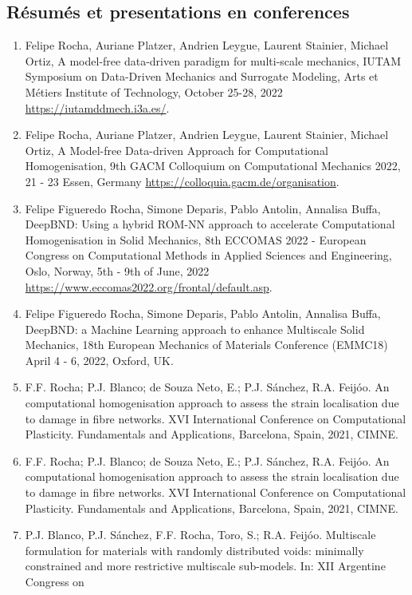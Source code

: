 \documentclass[french]{article}
\begin{document}
\subsection*{Résumés et presentations en conferences} 
\begin{enumerate}
	\item Felipe Rocha, Auriane Platzer, Andrien Leygue, Laurent Stainier, Michael Ortiz, A model-free data-driven paradigm for multi-scale mechanics, IUTAM Symposium on Data-Driven Mechanics and Surrogate Modeling, Arts et Métiers Institute of Technology, October 25-28, 2022 \url{https://iutamddmech.i3a.es/}.
	\item Felipe Rocha, Auriane Platzer, Andrien Leygue, Laurent Stainier, Michael Ortiz, A Model-free Data-driven Approach for Computational Homogenisation, 9th GACM Colloquium on Computational Mechanics 2022, 21 - 23 Essen, Germany \url{https://colloquia.gacm.de/organisation}.
	\item Felipe Figueredo Rocha, Simone Deparis, Pablo Antolin, Annalisa Buffa, 
	DeepBND: Using a hybrid ROM-NN approach to accelerate Computational Homogenisation in Solid Mechanics, 8th ECCOMAS 2022 - European Congress on Computational Methods
	in Applied Sciences and Engineering, Oslo, Norway, 5th - 9th of June, 2022 \url{https://www.eccomas2022.org/frontal/default.asp}.
	\item Felipe Figueredo Rocha, Simone Deparis, Pablo Antolin, Annalisa Buffa, 
	DeepBND: a Machine Learning approach to enhance Multiscale Solid Mechanics, 18th European Mechanics of Materials Conference (EMMC18)
	April 4 - 6, 2022, Oxford, UK.
	\item F.F. Rocha; P.J. Blanco; de Souza Neto, E.; P.J. Sánchez, R.A. Feijóo. An computational homogenisation approach to assess the strain localisation due to damage in fibre networks. XVI International Conference on Computational Plasticity. Fundamentals and Applications, Barcelona, Spain, 2021, CIMNE.
	\item F.F. Rocha; P.J. Blanco; de Souza Neto, E.; P.J. Sánchez, R.A. Feijóo. An computational homogenisation approach to assess the strain localisation due to damage in fibre networks. XVI International Conference on Computational Plasticity. Fundamentals and Applications, Barcelona, Spain, 2021, CIMNE.
	\item P.J. Blanco, P.J. Sánchez, F.F. Rocha, Toro, S.; R.A. Feijóo.
	Multiscale formulation for materials with randomly distributed voids: minimally constrained and more restrictive multiscale sub-models. In: XII Argentine Congress on

\end{enumerate}
\end{document}
